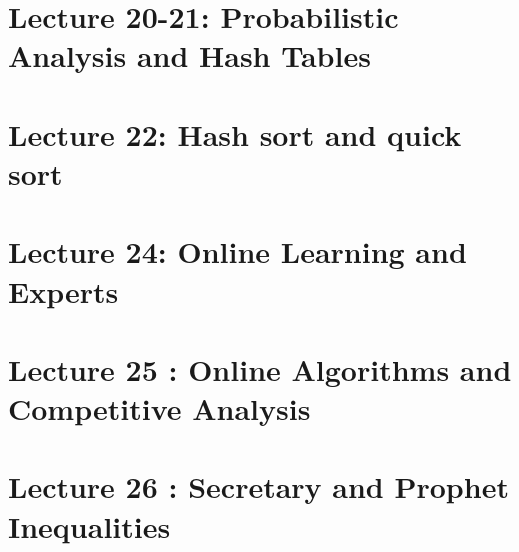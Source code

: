\documentclass[a4paper,11pt]{article}
\begin{document}
\section{Lecture 20-21: Probabilistic Analysis and Hash Tables}


\section{Lecture 22: Hash sort and quick sort}


\section{Lecture 24: Online Learning and Experts}


\section{Lecture 25 : Online Algorithms and Competitive Analysis}


\section{Lecture 26 : Secretary and Prophet Inequalities}

\end{document}
